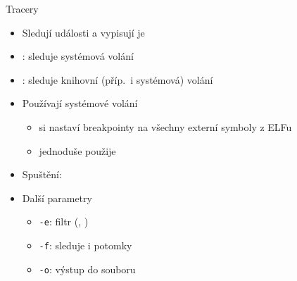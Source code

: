 
\begin{frame}{Tracery}

  \begin{itemize}
    \item Sledují události a vypisují je
    \item {}: sleduje systémová volání
    \item {}: sleduje knihovní (příp.\ i systémová) volání

    \pause

    \item Používají systémové volání 
    \begin{itemize}
      \item {} si nastaví breakpointy na všechny externí symboly z
	ELFu
      \item {} jednoduše použije 
    \end{itemize}

    \pause

    \item Spuštění: 
    \item Další parametry
    \begin{itemize}
      \item \texttt{-e}: filtr (, )
      \item \texttt{-f}: sleduje i potomky
      \item \texttt{-o}: výstup do souboru
    \end{itemize}
  \end{itemize}

\end{frame}

